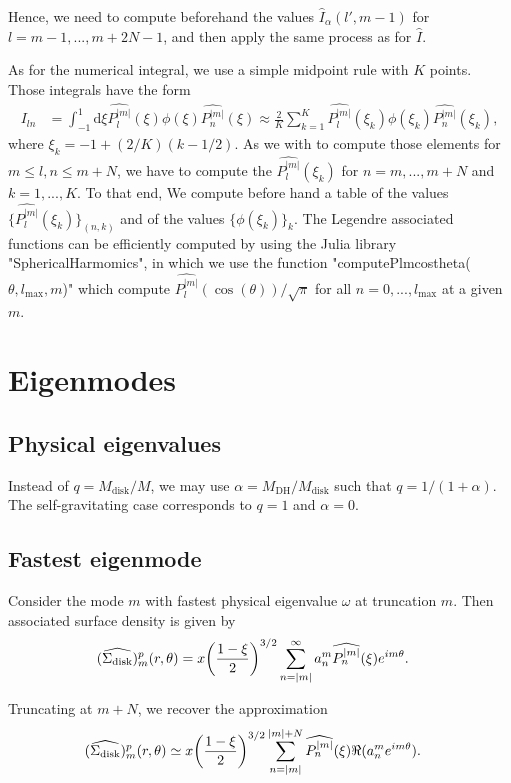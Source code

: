 \documentclass[11pt]{article}
\newcommand{\rd}{\mathrm{d}}
\newcommand{\Sigmad}{\Sigma_{\rm{disk}}}
\newcommand{\anm}{a_n^m}
\newcommand{\Pnm}{P_n^{|m|}}
\newcommand{\Plm}{P_l^{|m|}}
\newcommand{\hPnm}{\widehat{\Pnm}}
\newcommand{\hPlm}{\widehat{\Plm}}
\newcommand{\hI}{\widehat{I}}
\begin{document}
Hence, we need to compute beforehand the values $\hI_{\alpha}(l',m-1)$ for $l=m-1,...,m+2N-1$, and then apply the same process as for $\hI$. 

As for the numerical integral, we use a simple midpoint rule with $K$ points. Those integrals have the form
\begin{align*}
I_{ln} &= \int_{-1}^{1} \rd \xi \hPlm(\xi) \phi(\xi) \hPnm(\xi) \approx \frac{2}{K} \sum_{k=1}^{K} \hPlm(\xi_{k}) \phi(\xi_{k}) \hPnm(\xi_{k}),
\end{align*}
where $\xi_{k} = -1 + (2/K)(k-1/2)$. As we with to compute those elements for $m \leq l,n \leq m+N$, we have to compute the $\hPlm(\xi_{k})$ for $n=m,...,m+N$ and $k=1,...,K$. To that end, We compute before hand a table of the values $\{\hPlm(\xi_{k})\}_{(n,k)}$ and of the values $\{\phi(\xi_{k})\}_{k}$. The Legendre associated functions can be efficiently computed by using the Julia library "SphericalHarmomics", in which we use the function "computePlmcostheta($\theta,l_{\max},m$)" which compute $\hPlm(\cos(\theta))/\sqrt{\pi}$ for all $n=0,...,l_{\max}$ at a given $m$.

\section{Eigenmodes}

\subsection{Physical eigenvalues}

Instead of $q=M_{\mathrm{disk}}/M$, we may use $\alpha = M_{\mathrm{DH}}/M_{\mathrm{disk}}$ such that $q=1/(1+\alpha)$. The self-gravitating case corresponds to $q=1$ and $\alpha=0$.

\subsection{Fastest eigenmode}
Consider the mode $m$ with fastest physical eigenvalue $\omega$ at truncation $m$. Then associated surface density is given by
\begin{align}
(\widehat{\Sigmad})_m^p (r,\theta) &= x \bigg(\frac{1-\xi}{2}\bigg)^{3/2} \sum_{n=|m|}^{\infty} \anm \hPnm(\xi) e^{i m \theta}.
\end{align}

Truncating at $m+N$, we recover the approximation 
\begin{align}
(\widehat{\Sigmad})_m^p (r,\theta) &\simeq x \bigg(\frac{1-\xi}{2}\bigg)^{3/2} \sum_{n=|m|}^{|m|+N}  \hPnm(\xi)\Re (\anm e^{i m \theta}).
\end{align}
\end{document}
